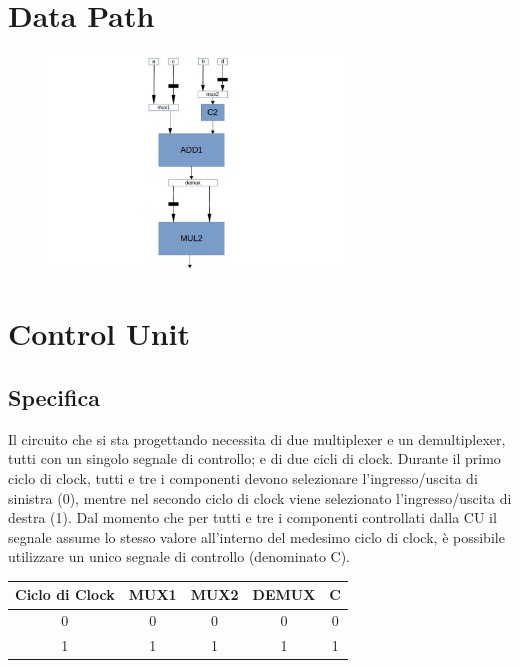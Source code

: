 \documentclass[10pt]{article}
\begin{document}
\begin{itemize}
\section{Data Path}
\begin{figure}[H]
    \centering
    \includegraphics[width=0.7\textwidth]{datapath}
\end{figure}


\section{Control Unit}

\subsection{Specifica}
Il circuito che si sta progettando necessita di due multiplexer e un demultiplexer, tutti con un singolo segnale di controllo; e di due cicli di clock.
Durante il primo ciclo di clock, tutti e tre i componenti devono selezionare l'ingresso/uscita di sinistra (0), mentre nel secondo ciclo di clock viene selezionato l'ingresso/uscita
di destra (1).
Dal momento che per tutti e tre i componenti controllati dalla CU il segnale assume lo stesso valore all'interno del medesimo ciclo di clock, è possibile utilizzare un unico segnale
di controllo (denominato C).

\begin{table}[H]
    \begin{minipage}[c]{\textwidth}
    \centering
    \begin{tabular}{|c|ccc|c|}
        \hline
        \textbf{Ciclo di Clock} & \textbf{MUX1} & \textbf{MUX2} & \textbf{DEMUX} & \textbf{C}\\ \hline
        0                       & 0             & 0             & 0              & 0         \\ 
        1                       & 1             & 1             & 1              & 1         \\ \hline
        \end{tabular}
    \end{minipage}
    \end{table}


\end{itemize}
\end{document}
